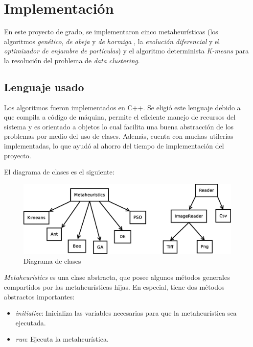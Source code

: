 \chapter{Implementación} \label{sect:impresultados}

    En este proyecto de grado, se implementaron cinco metaheurísticas (los algoritmos
\emph{genético}\cite{DoGeGr2007}, \emph{de abeja}\cite{BEE_0} y \emph{de hormiga}
\cite{OuBa2007}, la \emph{evolución diferencial}\cite{SwAjAm2008} y el \emph{optimizador
de enjambre de partículas}\cite{PSO_0}) y el algoritmo determinista \emph{K-means}
\cite{GePo2010} para la resolución del problema de \emph{data clustering}.

\section{Lenguaje usado} \label{sec:lusado}
    Los algoritmos fueron implementados en C++. Se eligió este lenguaje debido
a que compila a código de máquina, permite el eficiente manejo de
recursos del sistema y es orientado a objetos lo cual facilita una buena
abstracción de los problemas por medio del uso de clases. Además, cuenta con
muchas utilerías implementadas, lo que ayudó al ahorro del tiempo de implementación
del proyecto.

El diagrama de clases es el siguiente:

\begin{figure}[htb]
\centering
\includegraphics[scale=0.35]{figures/clases.eps}
\caption{Diagrama de clases}
\label{fig:jclases}
\end{figure}

    \emph{Metaheuristics} es una clase abstracta, que posee algunos métodos
generales compartidos por las metaheurísticas hijas. En especial, tiene dos
métodos abstractos importantes:
\begin{itemize}
    \item \emph{initialize}: Inicializa las variables necesarias para que la
metaheurística sea ejecutada.
    \item \emph{run}: Ejecuta la metaheurística.
\end{itemize}

